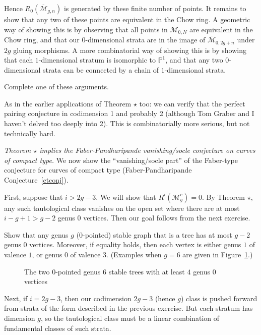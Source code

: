 \documentclass[12pt,letterpaper]{amsart}
\newcommand{\epoint}[1]{\vspace{3mm}\par \noindent \refstepcounter{subsection}{\bf \thesubsection.} 
  {\em #1.} }
\newcommand{\proj}{\mathbb P}
\newcommand{\cm}{{\mathcal{M}}}
\newcommand{\cmbar}{\overline{\cm}}
\newcommand{\lremind}[1]{{\bf[label:  #1]}}
\renewcommand{\lremind}[1]{{}}
\begin{document}
{Hence $R_0(\cmbar_{g,n})$ is generated by these finite number of points.
It remains to show that any two of these points are equivalent
in the Chow ring.  A geometric way of showing this is by observing
that all points in $\cmbar_{0,N}$ are equivalent in the Chow ring, and
that our $0$-dimensional strata are in the image of $\cmbar_{0,2g+n}$ under
$2g$ gluing morphisms.  A more combinatorial way of showing this
is by showing that each $1$-dimensional stratum is isomorphic to $\proj^1$,
and that any two $0$-dimensional strata can be connected by a chain
of $1$-dimensional strata.

Complete one of these arguments.

As in the earlier applications of Theorem $\star$ too: we can verify
that the perfect pairing conjecture in codimension 1 and probably 2
(although Tom Graber and I haven't delved too deeply into 2).  This is
combinatorially more serious, but not technically hard.



\epoint{Theorem $\star$ implies the Faber-Pandharipande vanishing/socle
  conjecture on curves of compact type} We now show the ``vanishing/socle
part'' of the Faber-type conjecture for curves of compact type
(Faber-Pandharipande Conjecture~\ref{ctconj}).
\label{ctpf}\lremind{ctpf}

First, suppose that $i>2g-3$.  We will show that $R^i(\cm_g^c) = 0$.
By Theorem $\star$, any such tautological class vanishes on the
open set where there are at most $i-g+1 > g-2$ genus $0$ vertices.  
Then our goal follows from the next exercise.

Show that any genus $g$ ($0$-pointed) stable graph that is a
tree has at most $g-2$ genus $0$ vertices.
Moreover, if equality holds, then each vertex is either genus $1$
of valence $1$, or genus $0$ of valence $3$.  (Examples when
$g=6$ are given in Figure~\ref{g6}.)
\begin{figure}
\begin{center}

\end{center}
\caption{The two $0$-pointed genus $6$ stable trees with at least $4$
genus $0$ vertices\lremind{g6}}\label{g6}
\end{figure}

Next, if $i=2g-3$, then our codimension $2g-3$ (hence $g$) class is
pushed forward from strata of the form described in the previous
exercise.  But each stratum has dimension $g$,
so the tautological class must be a linear combination
of fundamental classes of such strata.

}
\end{document}
